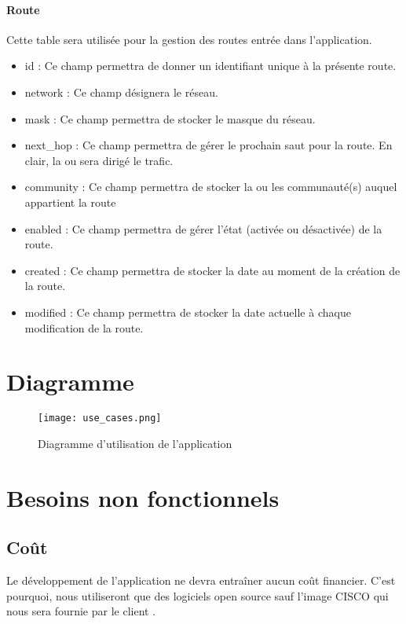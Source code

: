 \paragraph{Route} Cette table sera utilisée pour la gestion des routes entrée dans l'application.
\begin{itemize}
    \item id : Ce champ permettra de donner un identifiant unique à la présente route.
    \item network : Ce champ désignera le réseau.
    \item mask : Ce champ permettra de stocker le masque du réseau.
    \item next\_hop : Ce champ permettra de gérer le prochain saut pour la route. En clair, la ou sera dirigé le trafic.
    \item community : Ce champ permettra de stocker la ou les communauté(s) auquel appartient la route
    \item enabled : Ce champ permettra de gérer l'état (activée ou désactivée) de la route.
    \item created : Ce champ permettra de stocker la date au moment de la création de la route.
    \item modified : Ce champ permettra de stocker la date actuelle à chaque modification de la route.
\end{itemize}

\section{Diagramme}

\begin{figure}[H]
    \texttt{[image: use\_cases.png]}
    \caption{Diagramme d'utilisation de l'application}
    \label{fig:use_cases}
\end{figure}

\newpage

\section{Besoins non fonctionnels}

\subsection{Coût}
Le développement de l'application ne devra entraîner aucun coût financier. C'est pourquoi, nous utiliseront que des logiciels open source sauf l'image CISCO qui nous sera fournie par le client .

